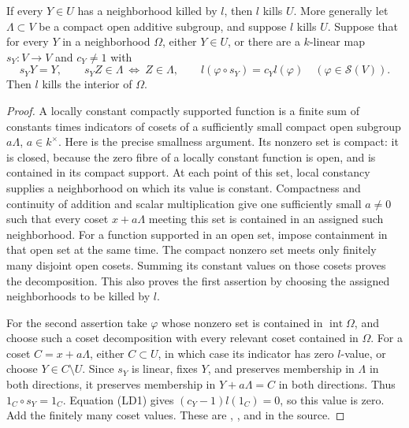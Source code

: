 \begin{srlemma}
\label{lem:sr-source-local-kills}
If every \(Y\in U\) has a neighborhood killed by \(l\), then \(l\)
kills \(U\).
More generally let \(\Lambda\subset V\) be a compact open additive
subgroup, and suppose \(l\) kills \(U\).
Suppose that for every \(Y\) in a neighborhood \(\Omega\), either
\(Y\in U\), or there are a \(k\)-linear map \(s_Y:V\to V\)
and \(c_Y\ne1\) with
\[
 s_YY=Y,\qquad
 s_YZ\in\Lambda\ \Longleftrightarrow\ Z\in\Lambda,\qquad
 l(\varphi\circ s_Y)=c_Yl(\varphi)\quad(\varphi\in\mathcal S(V)).
 \tag{LD1}\label{eq:sr-source-local-stabilizer}
\]
Then \(l\) kills the interior of \(\Omega\).
\end{srlemma}
\begin{proof}
A locally constant compactly supported function is a finite sum
of constants times indicators of cosets of a sufficiently small
compact open subgroup \(a\Lambda\), \(a\in k^\times\).
Here is the precise smallness argument.
Its nonzero set is compact: it is closed, because the zero fibre of
a locally constant function is open, and is contained in its compact
support.
At each point of this set, local constancy supplies a neighborhood
on which its value is constant.
Compactness and continuity of addition and scalar multiplication
give one sufficiently small \(a\ne0\) such that every coset
\(x+a\Lambda\) meeting this set is contained in an assigned such
neighborhood.
For a function supported in an open set, impose containment in that
open set at the same time.
The compact nonzero set meets only finitely many disjoint open
cosets. Summing its constant values on those cosets proves the
decomposition. This also proves the first assertion by choosing
the assigned neighborhoods to be killed by \(l\).

For the second assertion take \(\varphi\) whose nonzero set is
contained in \(\operatorname{int}\Omega\), and choose such a coset
decomposition with every relevant coset contained in \(\Omega\).
For a coset \(C=x+a\Lambda\), either \(C\subset U\), in which case
its indicator has zero \(l\)-value, or choose \(Y\in C\setminus U\).
Since \(s_Y\) is linear, fixes \(Y\), and preserves membership in
\(\Lambda\) in both directions, it preserves membership in
\(Y+a\Lambda=C\) in both directions.
Thus \(1_C\circ s_Y=1_C\).
Equation (LD1) gives
\((c_Y-1)l(1_C)=0\), so this value is zero.
Add the finitely many coset values.
These are , , and
 in the source.
\end{proof}

